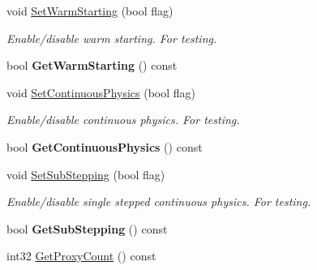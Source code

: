 \begin{DoxyCompactItemize}
\item 
void \hyperlink{classb2_world_a8e8c12142e8c4884a18787926a261359}{Set\+Warm\+Starting} (bool flag)\hypertarget{classb2_world_a8e8c12142e8c4884a18787926a261359}{}\label{classb2_world_a8e8c12142e8c4884a18787926a261359}

\begin{DoxyCompactList}\small\item\em Enable/disable warm starting. For testing. \end{DoxyCompactList}\item 
bool {\bfseries Get\+Warm\+Starting} () const \hypertarget{classb2_world_af7679b68ff6bf97d31a6136efaee562e}{}\label{classb2_world_af7679b68ff6bf97d31a6136efaee562e}

\item 
void \hyperlink{classb2_world_a536dd9181c2e20096073e3cfe2c8530a}{Set\+Continuous\+Physics} (bool flag)\hypertarget{classb2_world_a536dd9181c2e20096073e3cfe2c8530a}{}\label{classb2_world_a536dd9181c2e20096073e3cfe2c8530a}

\begin{DoxyCompactList}\small\item\em Enable/disable continuous physics. For testing. \end{DoxyCompactList}\item 
bool {\bfseries Get\+Continuous\+Physics} () const \hypertarget{classb2_world_aa11dbc1175a7a458e007722ab7287ff1}{}\label{classb2_world_aa11dbc1175a7a458e007722ab7287ff1}

\item 
void \hyperlink{classb2_world_ae8aacc78ea4753075067daff51b61778}{Set\+Sub\+Stepping} (bool flag)\hypertarget{classb2_world_ae8aacc78ea4753075067daff51b61778}{}\label{classb2_world_ae8aacc78ea4753075067daff51b61778}

\begin{DoxyCompactList}\small\item\em Enable/disable single stepped continuous physics. For testing. \end{DoxyCompactList}\item 
bool {\bfseries Get\+Sub\+Stepping} () const \hypertarget{classb2_world_ae3922f4935ad0dd7f85eea7550e18c5d}{}\label{classb2_world_ae3922f4935ad0dd7f85eea7550e18c5d}

\item 
int32 \hyperlink{classb2_world_a67f1f9fbdd85abd2100104c5eabe17cb}{Get\+Proxy\+Count} () const \hypertarget{classb2_world_a67f1f9fbdd85abd2100104c5eabe17cb}{}\label{classb2_world_a67f1f9fbdd85abd2100104c5eabe17cb}


\end{DoxyCompactItemize}

